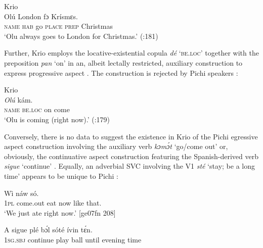 \ea%
    \label{ex:1:12}
{{Krio}}{}{}\\
    \gll   Olú        London  fɔ  Krísmɛs.\\
\textsc{name}  \textsc{hab}    go  \textsc{place}  \textsc{prep}  Christmas\\

\glt ‘Olu always goes to London for Christmas.’  (\citealt{YillahCorcoran2007}:181)
\z

Further, Krio employs the locative-existential copula \textit{dé} \textsc{‘be.loc’} together with the preposition \textit{pan} ‘on’ in an, albeit lectally restricted, auxiliary construction to express progressive aspect . The construction is rejected by Pichi speakers :


\ea%
    \label{ex:1:13}
{{Krio}}{}{}\\
    \gll   \textit{\textup{Olú}}           kám.\\
\textsc{name}  \textsc{be.loc}  on    come\\

\glt ‘Olu is coming (right now).’ (\citealt{YillahCorcoran2007}:179)
\z


\z

Conversely, there is no data to suggest the existence in Krio of the Pichi egressive aspect construction involving the auxiliary verb \textit{kɔmɔ́t} ‘go/come out’  or, obviously, the continuative aspect construction featuring the Spanish-derived verb \textit{sigue} ‘continue’ . Equally, an adverbial SVC involving the V1 \textit{sté} ‘stay; be a long time’ appears to be unique to Pichi : 


\ea%
    \label{ex:1:15}
    \gll   Wì        náw    só.\\
 \textsc{1pl}  come.out  eat    now    like that.\\
\glt ‘We just ate right now.’ [ge07fn 208]
\z


\ea%
    \label{ex:1:16}
    \gll   A    sigue    plé    bɔ́l  sóté    ívin    tɛ́n.\\
\textsc{1sg.sbj}  continue    play    ball  until  evening  time\\

